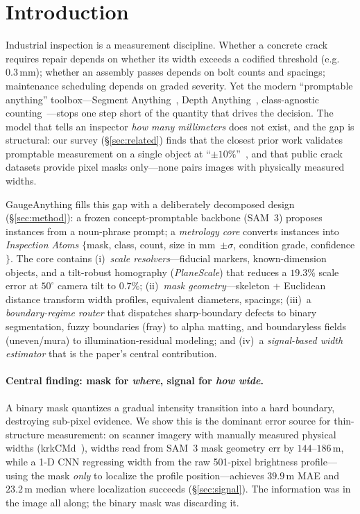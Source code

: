 \documentclass[11pt]{article}
\newcommand{\ours}{GaugeAnything}
\newcommand{\um}{\,\textmu m}
\begin{document}
\section{Introduction}

Industrial inspection is a measurement discipline. Whether a concrete crack requires repair
depends on whether its width exceeds a codified threshold (e.g.\ $0.3$\,mm); whether an
assembly passes depends on bolt counts and spacings; maintenance scheduling depends on
graded severity. Yet the modern ``promptable anything'' toolbox---Segment
Anything~\citep{kirillov2023sam,ravi2024sam2,sam3_2025}, Depth
Anything~\citep{yang2024depthv2}, class-agnostic counting~\citep{amini2024countgd}---stops
one step short of the quantity that drives the decision. The model that tells an inspector
\emph{how many millimeters} does not exist, and the gap is structural: our survey
(\S\ref{sec:related}) finds that the closest prior work validates promptable measurement on a
single object at ``$\pm10\%$''~\citep{measureanything2024}, and that public crack datasets
provide pixel masks only---none pairs images with physically measured widths.

\ours{} fills this gap with a deliberately decomposed design (\S\ref{sec:method}): a frozen
concept-promptable backbone (SAM~3) proposes instances from a noun-phrase prompt; a
\emph{metrology core} converts instances into \emph{Inspection Atoms}
$\{$mask, class, count, size in mm~$\pm\sigma$, condition grade, confidence$\}$. The core
contains (i)~\emph{scale resolvers}---fiducial markers, known-dimension objects, and a
tilt-robust homography (\emph{PlaneScale}) that reduces a $19.3\%$ scale error at $50^\circ$
camera tilt to $0.7\%$; (ii)~\emph{mask geometry}---skeleton + Euclidean distance transform
width profiles, equivalent diameters, spacings; (iii)~a \emph{boundary-regime router} that
dispatches sharp-boundary defects to binary segmentation, fuzzy boundaries (fray) to alpha
matting, and boundaryless fields (uneven/mura) to illumination-residual modeling; and
(iv)~a \emph{signal-based width estimator} that is the paper's central contribution.

\paragraph{Central finding: mask for \emph{where}, signal for \emph{how wide}.}
A binary mask quantizes a gradual intensity transition into a hard boundary, destroying
sub-pixel evidence. We show this is the dominant error source for thin-structure
measurement: on scanner imagery with manually measured physical widths
(krkCMd~\citep{krkcmd2025}), widths read from SAM~3 mask geometry err by $144$--$186$\um,
while a 1-D CNN regressing width from the raw 501-pixel brightness profile---using the mask
\emph{only} to localize the profile position---achieves $39.9$\um{} MAE and $23.2$\um{}
median where localization succeeds (\S\ref{sec:signal}). The information was in the image
all along; the binary mask was discarding it.
\end{document}
